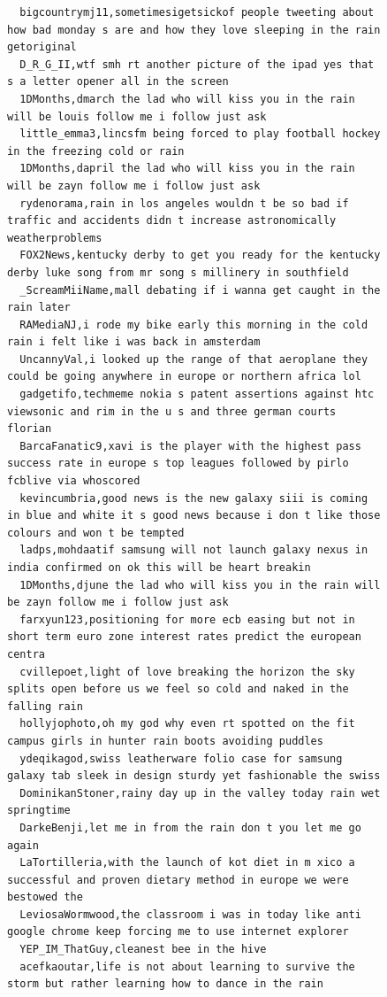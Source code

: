 \begin{figure}[htpb]
\begin{verbatim}
  bigcountrymj11,sometimesigetsickof people tweeting about how bad monday s are and how they love sleeping in the rain getoriginal
  D_R_G_II,wtf smh rt another picture of the ipad yes that s a letter opener all in the screen
  1DMonths,dmarch the lad who will kiss you in the rain will be louis follow me i follow just ask
  little_emma3,lincsfm being forced to play football hockey in the freezing cold or rain
  1DMonths,dapril the lad who will kiss you in the rain will be zayn follow me i follow just ask
  rydenorama,rain in los angeles wouldn t be so bad if traffic and accidents didn t increase astronomically weatherproblems
  FOX2News,kentucky derby to get you ready for the kentucky derby luke song from mr song s millinery in southfield
  _ScreamMiiName,mall debating if i wanna get caught in the rain later
  RAMediaNJ,i rode my bike early this morning in the cold rain i felt like i was back in amsterdam
  UncannyVal,i looked up the range of that aeroplane they could be going anywhere in europe or northern africa lol
  gadgetifo,techmeme nokia s patent assertions against htc viewsonic and rim in the u s and three german courts florian
  BarcaFanatic9,xavi is the player with the highest pass success rate in europe s top leagues followed by pirlo fcblive via whoscored
  kevincumbria,good news is the new galaxy siii is coming in blue and white it s good news because i don t like those colours and won t be tempted
  ladps,mohdaatif samsung will not launch galaxy nexus in india confirmed on ok this will be heart breakin
  1DMonths,djune the lad who will kiss you in the rain will be zayn follow me i follow just ask
  farxyun123,positioning for more ecb easing but not in short term euro zone interest rates predict the european centra
  cvillepoet,light of love breaking the horizon the sky splits open before us we feel so cold and naked in the falling rain
  hollyjophoto,oh my god why even rt spotted on the fit campus girls in hunter rain boots avoiding puddles
  ydeqikagod,swiss leatherware folio case for samsung galaxy tab sleek in design sturdy yet fashionable the swiss
  DominikanStoner,rainy day up in the valley today rain wet springtime
  DarkeBenji,let me in from the rain don t you let me go again
  LaTortilleria,with the launch of kot diet in m xico a successful and proven dietary method in europe we were bestowed the
  LeviosaWormwood,the classroom i was in today like anti google chrome keep forcing me to use internet explorer
  YEP_IM_ThatGuy,cleanest bee in the hive
  acefkaoutar,life is not about learning to survive the storm but rather learning how to dance in the rain

\end{verbatim}
\end{figure}
